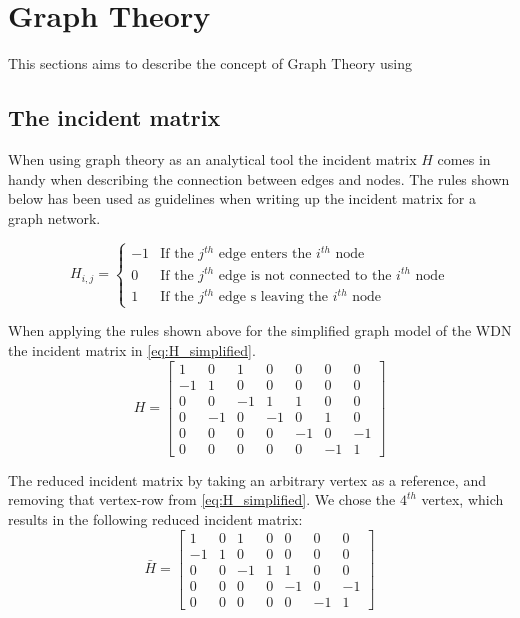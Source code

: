 \section{Graph Theory}
This sections aims to describe the concept of Graph Theory using 
\subsection{The incident matrix}
When using graph theory as an analytical tool the incident matrix $H$ comes in handy when describing the connection between edges and nodes. The rules shown below has been used as guidelines when writing up the incident matrix for a graph network. 

\begin{equation*}
H_{i,j} = \begin{cases}
    -1 & \text{If the $j^{th}$ edge enters the $i^{th}$ node} \\
    0 & \text{If the $j^{th}$ edge is not connected to the $i^{th}$ node} \\
    1 & \text{If the $j^{th}$ edge s leaving the $i^{th}$ node}
\end{cases}
\end{equation*} %

When applying the rules shown above for the simplified graph model of the WDN the incident matrix in \eqref{eq:H_simplified}.
\begin{equation}
    H = \begin{bmatrix}
1 & 0 & 1 & 0 & 0 & 0 & 0\\
-1 & 1 & 0 & 0 & 0 & 0 & 0\\
0 & 0 & -1 & 1 & 1 & 0 & 0\\
0 & -1 & 0 & -1 & 0 & 1 & 0\\
0 & 0 & 0 & 0 & -1 &  0  & -1\\
0 & 0 & 0 & 0 & 0 & -1 & 1
\end{bmatrix}
\label{eq:H_simplified}
\end{equation} %

The reduced incident matrix by taking an arbitrary vertex as a reference, and removing that vertex-row from \eqref{eq:H_simplified}. We chose the $4^{th}$ vertex, which results in the following reduced incident matrix:
\begin{equation}
    \bar{H} = \begin{bmatrix}
1 & 0 & 1 & 0 & 0 & 0 & 0\\
-1 & 1 & 0 & 0 & 0 & 0 & 0\\
0 & 0 & -1 & 1 & 1 & 0 & 0\\
0 & 0 & 0 & 0 & -1 &  0  & -1\\
0 & 0 & 0 & 0 & 0 & -1 & 1
\end{bmatrix}
\end{equation}

